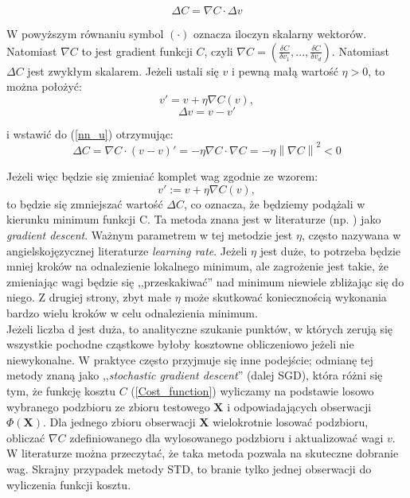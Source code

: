 \documentclass[licencjacka]{pracamgr}
\newcommand{\norm}[1]{\left\lVert#1\right\rVert}
\begin{document}
\begin{equation}
	\label{nn_u}
	\Delta C = \nabla C \cdot \Delta v
\end{equation}
 
W powyższym równaniu symbol $(\cdot)$ oznacza iloczyn skalarny wektorów. Natomiast $\nabla C$ to jest gradient funkcji $C$, czyli $\nabla C = (\frac{\delta C}{\delta v_{1}},...,\frac{\delta C}{\delta v_{d}} )$. Natomiast  $\Delta C$ jest zwykłym skalarem. Jeżeli ustali się $v$ i pewną małą wartość $\eta>0$, to można położyć:
$$v' = v + \eta\nabla C(v), $$
$$ \Delta v = v - v'$$
 
i wstawić do (\ref{nn_u}) otrzymując:
$$\Delta C = \nabla C\cdot (v - v)' = -\eta \nabla C\cdot\nabla C = -\eta\norm{\nabla C}^{2} < 0$$
 
Jeżeli więc będzie się zmieniać komplet wag zgodnie ze wzorem:
$$v':=v+\eta\nabla C(v),$$
to będzie się zmniejszać wartość $\Delta C$, co oznacza, że będziemy podążali w kierunku minimum funkcji C. Ta metoda znana jest w literaturze (np. \cite{nn}) jako \textit{gradient descent}. Ważnym parametrem w tej metodzie jest $\eta$, często nazywana w angielskojęzycznej literaturze \textit{learning rate}. Jeżeli $\eta$ jest duże, to potrzeba będzie mniej kroków na odnalezienie lokalnego minimum, ale zagrożenie jest takie, że zmieniając wagi będzie się ,,przeskakiwać'' nad minimum niewiele zbliżając się do niego. Z drugiej strony, zbyt małe $\eta$ może skutkować koniecznością wykonania bardzo wielu kroków w celu odnalezienia minimum.\\

Jeżeli liczba d jest duża, to analityczne szukanie punktów, w których zerują się wszystkie pochodne cząstkowe byłoby kosztowne obliczeniowo jeżeli nie niewykonalne. W praktyce często przyjmuje się inne podejście; odmianę tej metody znaną jako  ,,\textit{stochastic gradient descent}'' (dalej SGD), która różni się tym, że funkcję kosztu $C$ (\ref{Cost_function}) wyliczamy na podstawie losowo wybranego podzbioru ze zbioru testowego $\mathbf{X}$ i odpowiadających obserwacji $\Phi(\mathbf{X})$. Dla jednego zbioru obserwacji $\mathbf{X}$ wielokrotnie losować podzbioru, obliczać $\nabla C$ zdefiniowanego dla wylosowanego podzbioru i aktualizować wagi $v$. W literaturze można przeczytać, że taka metoda pozwala na skuteczne dobranie wag. Skrajny przypadek metody STD, to branie tylko jednej obserwacji do wyliczenia funkcji kosztu.\\
 
\end{document}
